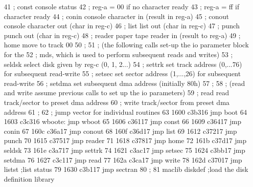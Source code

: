  41                       ;        const    console status
 42                       ;                 reg-a = 00 if no character ready
 43                       ;                 reg-a = ff if character ready
 44                       ;        conin    console character in (result in reg-a)
 45                       ;        conout   console character out (char in reg-c)
 46                       ;        list     list out (char in reg-c)
 47                       ;        punch    punch out (char in reg-c)
 48                       ;        reader   paper tape reader in (result to reg-a)
 49                       ;        home     move to track 00
 50                       ;
 51                       ;        (the following calls set-up the io parameter block for the
 52                       ;        mds, which is used to perform subsequent reads and writes)
 53                       ;        seldsk   select disk given by reg-c (0, 1, 2...)
 54                       ;        settrk   set track address (0,...76) for subsequent read-write
 55                       ;        setsec   set sector address (1,...,26) for subsequent read-write
 56                       ;        setdma   set subsequent dma address (initially 80h)
 57                       ;
 58                       ;        (read and write assume previous calls to set up the io parameters)
 59                       ;        read     read track/sector to preset dma address
 60                       ;        write    track/sector from preset dma address
 61                       ;
 62                       ;        jump vector for individual routines
 63      1600 c3b316               jmp      boot
 64      1603 c3c316      wboote:  jmp      wboot
 65      1606 c36117               jmp      const
 66      1609 c36417               jmp      conin
 67      160c c36a17               jmp      conout
 68      160f c36d17               jmp      list
 69      1612 c37217               jmp      punch
 70      1615 c37517               jmp      reader
 71      1618 c37817               jmp      home
 72      161b c37d17               jmp      seldsk
 73      161e c3a717               jmp      settrk
 74      1621 c3ac17               jmp      setsec
 75      1624 c3bb17               jmp      setdma
 76      1627 c3c117               jmp      read
 77      162a c3ca17               jmp      write
 78      162d c37017               jmp      listst     ;list status
 79      1630 c3b117               jmp      sectran
 80                       ;
 81                                maclib   diskdef    ;load the disk definition library
